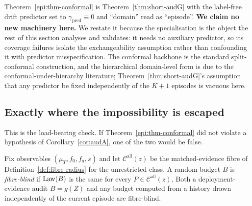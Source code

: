 \begin{remark}\label{epi:rem-audG}
Theorem~\ref{epi:thm-conformal} is Theorem~\ref{thm:short-audG} with the label-free drift predictor
set to $\gamma_{\mathrm{pred}}\equiv0$ and ``domain'' read as ``episode''. \textbf{We claim no new
machinery here.} We restate it because the specialisation is the object the rest of this section
analyses and validates: it needs no auxiliary predictor, so its coverage failures isolate the
exchangeability assumption rather than confounding it with predictor misspecification. The
conformal backbone is the standard split-conformal construction, and the hierarchical domain-level
form is due to the conformal-under-hierarchy literature; Theorem~\ref{thm:short-audG}'s assumption
that any predictor be fixed independently of the $K{+}1$ episodes is vacuous here.
\end{remark}

\subsection{Exactly where the impossibility is escaped}

This is the load-bearing check. If Theorem~\ref{epi:thm-conformal} did not violate a hypothesis of
Corollary~\ref{cor:audA}, one of the two would be false.

\begin{definition}\label{epi:def-fibreblind}
Fix observables $(\mu_T,f_0,f_a,s)$ and let $\mathcal C^{\mathrm{all}}(z)$ be the matched-evidence
fibre of Definition~\ref{def:fibre-radius} for the unrestricted class. A random budget $B$ is
\emph{fibre-blind} if $\mathrm{Law}(B)$ is the same for every $P\in\mathcal C^{\mathrm{all}}(z)$. Both a
deployment-evidence audit $B=g(Z)$ and any budget computed from a history drawn independently of the
current episode are fibre-blind.
\end{definition}

